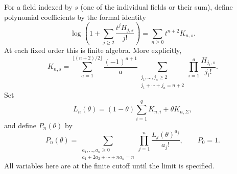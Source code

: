 \documentclass[11pt,reqno]{amsart}
\numberwithin{equation}{section}
\theoremstyle{plain}
\theoremstyle{definition}
\begin{document}
For a field indexed by $s$ (one of the individual fields or their sum), define polynomial coefficients by the formal identity
\begin{equation}\label{eq:logcoeff}
 \log\left(1+\sum_{j\geq2}\frac{t^jH_{j,s}}{j!}\right)
 =\sum_{n\geq0}t^{n+2}K_{n,s}.
\end{equation}
At each fixed order this is finite algebra. More explicitly,
\begin{equation}\label{eq:logcoeff-explicit}
 K_{n,s}=\sum_{a=1}^{\lfloor(n+2)/2\rfloor}\frac{(-1)^{a+1}}a
 \sum_{\substack{j_1,\ldots,j_a\geq2\\j_1+\cdots+j_a=n+2}}
 \prod_{i=1}^a\frac{H_{j_i,s}}{j_i!}.
\end{equation}
Set
\begin{equation}\label{eq:Lcoeff}
 L_n(\theta)=(1-\theta)\sum_{i=1}^qK_{n,i}+\theta K_{n,\Sigma},
\end{equation}
and define $P_n(\theta)$ by
\begin{equation}\label{eq:Bell}
 P_n(\theta)=
 \sum_{\substack{a_1,\ldots,a_n\geq0\\a_1+2a_2+\cdots+na_n=n}}
 \prod_{j=1}^n\frac{L_j(\theta)^{a_j}}{a_j!},\qquad P_0=1.
\end{equation}
All variables here are at the finite cutoff until the limit is specified.
\end{document}

